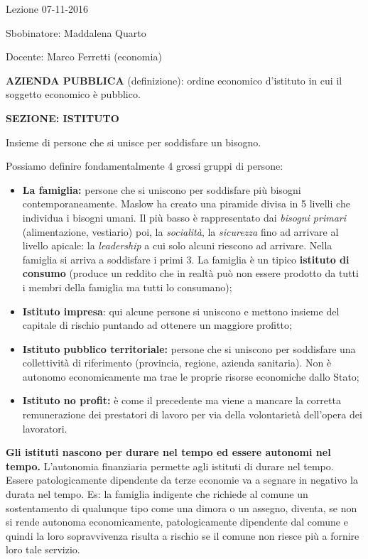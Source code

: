 \documentclass[]{article}
\date{}
\begin{document}
Lezione 07-11-2016

Sbobinatore: Maddalena Quarto

Docente: Marco Ferretti (economia)

\textbf{AZIENDA PUBBLICA} (definizione): ordine economico d'istituto in
cui il soggetto economico è pubblico.

\textbf{SEZIONE: ISTITUTO}

Insieme di persone che si unisce per soddisfare un bisogno.

Possiamo definire fondamentalmente 4 grossi gruppi di persone:

\begin{itemize}
\item
  \textbf{La famiglia:} persone che si uniscono per soddisfare più
  bisogni contemporaneamente. Maslow ha creato una piramide divisa in 5
  livelli che individua i bisogni umani. Il più basso è rappresentato
  dai \emph{bisogni primari} (alimentazione, vestiario) poi, la
  \emph{socialità}, la \emph{sicurezza} fino ad arrivare al livello
  apicale: la \emph{leadership} a cui solo alcuni riescono ad arrivare.
  Nella famiglia si arriva a soddisfare i primi 3. La famiglia è un
  tipico \textbf{istituto di consumo} (produce un reddito che in realtà
  può non essere prodotto da tutti i membri della famiglia ma tutti lo
  consumano);
\item
  \textbf{Istituto impresa}: qui alcune persone si uniscono e mettono
  insieme del capitale di rischio puntando ad ottenere un maggiore
  profitto;
\item
  \textbf{Istituto pubblico territoriale:} persone che si uniscono per
  soddisfare una collettività di riferimento (provincia, regione,
  azienda sanitaria). Non è autonomo economicamente ma trae le proprie
  risorse economiche dallo Stato;
\item
  \textbf{Istituto no profit:} è come il precedente ma viene a mancare
  la corretta remunerazione dei prestatori di lavoro per via della
  volontarietà dell'opera dei lavoratori.
\end{itemize}

\textbf{Gli istituti nascono per durare nel tempo ed essere autonomi nel
tempo.} L'autonomia finanziaria permette agli istituti di durare nel
tempo. Essere patologicamente dipendente da terze economie va a segnare
in negativo la durata nel tempo. Es: la famiglia indigente che richiede
al comune un sostentamento di qualunque tipo come una dimora o un
assegno, diventa, se non si rende autonoma economicamente,
patologicamente dipendente dal comune e quindi la loro sopravvivenza
risulta a rischio se il comune non riesce più a fornire loro tale
servizio.
\end{document}
